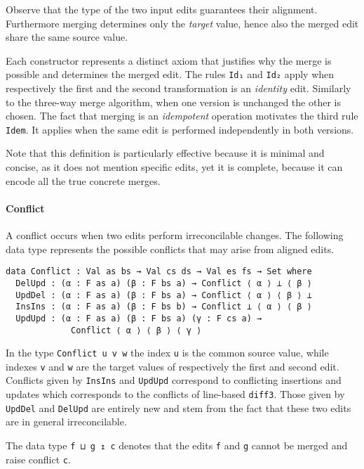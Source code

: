 \documentclass[preprint]{sigplanconf}
\begin{document}
	Observe that the type of the two input edits guarantees their alignment.
	Furthermore merging determines only the \emph{target} value,
	hence also the merged edit share the same source value.

	Each constructor represents a distinct axiom that justifies why
	the merge is possible and determines the merged edit.
	The rules \texttt{Id₁} and \texttt{Id₂} apply when 
	respectively the first and the second transformation is an \emph{identity} 
        edit.
	Similarly to the three-way merge algorithm, when one version is unchanged the other
        is chosen.
	The fact that merging is an \emph{idempotent} operation motivates the 
	third rule \texttt{Idem}.
	It applies when the same edit is performed independently in both versions.
	
	Note that this definition is particularly effective because it is 
	minimal and concise, as it does not mention specific
	edits, yet it is complete, because it can encode all the true concrete 
        merges.	

	\paragraph{Conflict}
	A conflict occurs when two edits perform irreconcilable changes.
	The following data type represents the possible conflicts that may arise
	from aligned edits.
	
\begin{verbatim}
data Conflict : Val as bs → Val cs ds → Val es fs → Set where
  DelUpd : (α : F as a) (β : F bs a) → Conflict ⟨ α ⟩ ⊥ ⟨ β ⟩
  UpdDel : (α : F as a) (β : F bs a) → Conflict ⟨ α ⟩ ⟨ β ⟩ ⊥ 
  InsIns : (α : F as a) (β : F bs b) → Conflict ⊥ ⟨ α ⟩ ⟨ β ⟩
  UpdUpd : (α : F as a) (β : F bs a) (γ : F cs a) →
             Conflict ⟨ α ⟩ ⟨ β ⟩ ⟨ γ ⟩    
\end{verbatim}

	In the type \texttt{Conflict u v w} the index \texttt{u} is
        the common source value, while indexes \texttt{v} and
        \texttt{w} are the target values of respectively the first and
        second edit.  Conflicts given by \texttt{InsIns} and
        \texttt{UpdUpd} correspond to conflicting insertions and
        updates which corresponds to the conflicts of line-based
        \texttt{diff3}.  Those given by \texttt{UpdDel} and
        \texttt{DelUpd} are entirely new and stem from the fact that
        these two edits are in general irreconcilable.

	The data type \texttt{f ⊔ g ↥ c} denotes that the edits
        \texttt{f} and \texttt{g} cannot be merged and raise conflict
        \texttt{c}.
\end{document}
